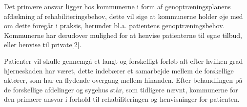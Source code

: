Det primære ansvar ligger hos kommunerne i form af genoptræningsplanens afdækning af rehabiliteringsbehov, dette vil sige at kommunerne holder øje med om dette foregår i praksis, herunder bl.a. patientens genoptræningsbehov. Kommunerne har derudover mulighed for at henvise patienterne til egne tilbud, eller henvise til private[2]. 

Patienter vil skulle gennemgå et langt og forskelligt forløb alt efter hvilken grad hjerneskaden har været, dette indebærer et samarbejde mellem de forskellige aktører, som har en flydende overgang mellem hinanden. Efter behandlingen på de forskellige afdelinger og sygehus står, som tidligere nævnt, kommunerne for den primære ansvar i forhold til rehabiliteringen og henvisninger for patienten. 


